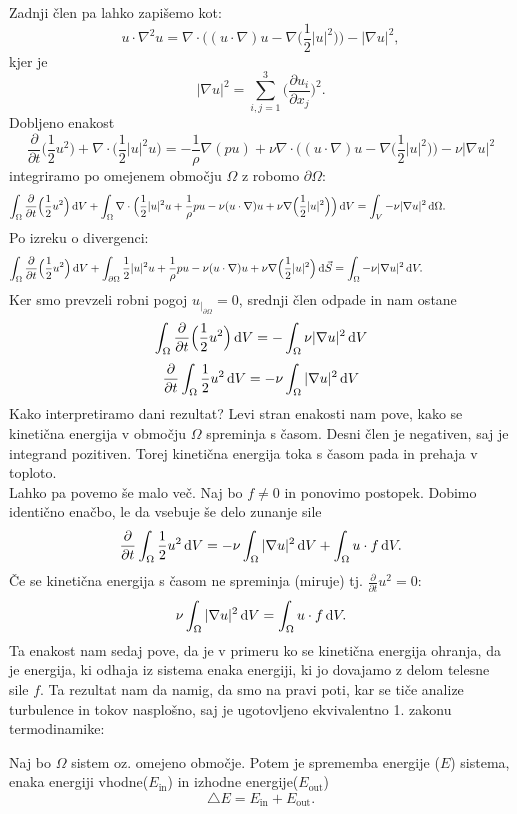 \documentclass[mat2, tisk]{fmfdelo}
\begin{document}
Zadnji člen pa lahko zapišemo kot:
$$
u\cdot \nabla^2 u = \nabla\cdot\Big((u\cdot \nabla)u - \nabla\Big(\frac{1}{2} |u|^2\Big)\Big) - |\nabla u|^2,
$$
kjer je 
\begin{equation}
\label{gradnorm}
  |\nabla u|^2 = \sum_{i,j=1}^3 \Big(\frac{\partial u_i}{\partial x_j}\Big)^2.
\end{equation}
Dobljeno enakost 
$$
\frac{\partial}{\partial t} \Big(\frac{1}{2} u^2 \Big) + \nabla \cdot \Big(\frac{1}{2} |u|^2 u\Big) = 
-\frac{1}{\rho}\nabla(p u) + \nu \nabla\cdot\Big((u\cdot \nabla)u - \nabla\Big(\frac{1}{2} |u|^2\Big)\Big) - \nu|\nabla u|^2
$$
integriramo po omejenem območju $\Omega$ z robomo $\partial \Omega$:
\begin{align*}
\int_\Omega \frac{\partial}{\partial t} \Big(\frac{1}{2} u^2 \Big)\dif V + \int_\Omega \nabla \cdot\Big(\frac{1}{2} |u|^2 u
+\frac{1}{\rho}p u - \nu(u\cdot \nabla)u + \nu\nabla\Big(\frac{1}{2} |u|^2\Big)\Big)\dif V =\int_V - \nu|\nabla u|^2 \dif \Omega.\qquad\qquad\qquad
\end{align*}
Po izreku o divergenci:
\begin{align*}
  \int_\Omega \frac{\partial}{\partial t} \Big(\frac{1}{2} u^2 \Big)\dif V + \int_{\partial\Omega} \frac{1}{2} |u|^2 u
  +\frac{1}{\rho}p u - \nu(u\cdot \nabla)u + \nu\nabla\Big(\frac{1}{2} |u|^2\Big)\dif \vec{S} =\int_\Omega - \nu|\nabla u|^2 \dif V.\qquad\qquad\qquad\qquad
\end{align*}
Ker smo prevzeli robni pogoj $u_{|_{\partial\Omega}} = 0$, srednji člen odpade in nam ostane 
$$
\int_\Omega \frac{\partial}{\partial t} \Big(\frac{1}{2} u^2 \Big)\dif V = - \int_\Omega\nu|\nabla u|^2 \dif V
$$
$$
\frac{\partial}{\partial t}\int_\Omega \frac{1}{2} u^2 \dif V = - \nu\int_\Omega |\nabla u|^2 \dif V
$$
\newpage
Kako interpretiramo dani rezultat? Levi stran enakosti nam pove, kako se kinetična energija 
v območju $\Omega$ spreminja s časom. Desni člen je negativen, saj je integrand pozitiven.
Torej kinetična energija toka s časom pada in prehaja v toploto.\\
Lahko pa povemo še malo več. Naj bo $f \neq 0$ in ponovimo postopek. Dobimo identično 
enačbo, le da vsebuje še delo zunanje sile
$$
\frac{\partial}{\partial t}\int_\Omega \frac{1}{2} u^2 \dif V = - \nu\int_\Omega |\nabla u|^2 \dif V + \int_\Omega u\cdot f \dif V.
$$
Če se kinetična energija s časom ne spreminja (miruje) tj. $\frac{\partial}{\partial t} u^2 = 0$:
$$
 \nu\int_\Omega |\nabla u|^2 \dif V = \int_\Omega u\cdot f \dif V.
$$
Ta enakost nam sedaj pove, da je v primeru ko se kinetična energija ohranja, da je 
energija, ki odhaja iz sistema enaka energiji, ki jo dovajamo z delom telesne sile $f$.
Ta rezultat nam da namig, da smo na pravi poti, kar se tiče analize turbulence in tokov
nasplošno, saj je ugotovljeno ekvivalentno 1. zakonu termodinamike:
\begin{definicija}
Naj bo $\Omega$ sistem oz. omejeno območje. Potem je sprememba energije ($E$) sistema, 
enaka energiji vhodne($E_\text{in}$) in izhodne energije($E_{\text{out}}$)
\begin{equation}
\triangle E = E_\text{in} + E_{\text{out}}.
\end{equation}
\end{definicija}
\end{document}
